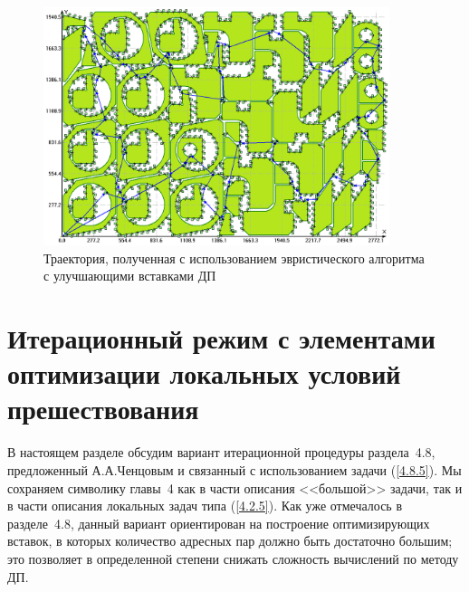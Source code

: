 \documentclass[11pt,twoside,openany]{report}
\begin{document}
{{\begin{figure}
  \begin{center}
  \includegraphics[width=0.9\textwidth]{routing_75_checking_ins.png}
  \caption{Траектория, полученная с использованием эвристического алгоритма с
улучшающими вставками ДП}
  \label{DP_Inserts_Result}
  \end{center}
\end{figure}















{\raggedright\section{
  Итерационный режим с элементами оптимизации локальных условий
  прешествования
}}
\label{sect:5.4}
\setcounter{equation}{0}

В настоящем разделе обсудим вариант итерационной процедуры раздела~4.8,
предложенный А.А.Ченцовым и связанный с использованием задачи (\ref{4.8.5}).
Мы сохраняем символику главы~4 как в части описания <<большой>> задачи, так
и в части описания локальных задач типа (\ref{4.2.5}). Как уже отмечалось
в разделе~4.8, данный вариант ориентирован на построение оптимизирующих вставок,
в которых количество адресных пар должно быть достаточно большим; это позволяет
в определенной степени снижать сложность вычислений по методу ДП.

}}
\end{document}
